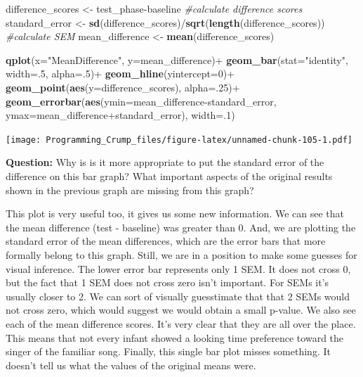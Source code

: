 \documentclass[]{book}
\newenvironment{Shaded}{\begin{snugshade}}{\end{snugshade}}
\newcommand{\KeywordTok}[1]{\textcolor[rgb]{0.13,0.29,0.53}{\textbf{{#1}}}}
\newcommand{\DataTypeTok}[1]{\textcolor[rgb]{0.13,0.29,0.53}{{#1}}}
\newcommand{\DecValTok}[1]{\textcolor[rgb]{0.00,0.00,0.81}{{#1}}}
\newcommand{\StringTok}[1]{\textcolor[rgb]{0.31,0.60,0.02}{{#1}}}
\newcommand{\CommentTok}[1]{\textcolor[rgb]{0.56,0.35,0.01}{\textit{{#1}}}}
\newcommand{\NormalTok}[1]{{#1}}
\theoremstyle{definition}
\theoremstyle{definition}
\theoremstyle{definition}
\theoremstyle{remark}
\begin{document}
\begin{Shaded}
\begin{Highlighting}[]
\NormalTok{difference_scores <-}\StringTok{ }\NormalTok{test_phase-baseline }\CommentTok{#calculate difference scores}
\NormalTok{standard_error <-}\StringTok{ }\KeywordTok{sd}\NormalTok{(difference_scores)/}\KeywordTok{sqrt}\NormalTok{(}\KeywordTok{length}\NormalTok{(difference_scores)) }\CommentTok{#calculate SEM}
\NormalTok{mean_difference <-}\StringTok{ }\KeywordTok{mean}\NormalTok{(difference_scores)}

\KeywordTok{qplot}\NormalTok{(}\DataTypeTok{x=}\StringTok{"MeanDifference"}\NormalTok{, }\DataTypeTok{y=}\NormalTok{mean_difference)+}
\StringTok{  }\KeywordTok{geom_bar}\NormalTok{(}\DataTypeTok{stat=}\StringTok{"identity"}\NormalTok{, }\DataTypeTok{width=}\NormalTok{.}\DecValTok{5}\NormalTok{, }\DataTypeTok{alpha=}\NormalTok{.}\DecValTok{5}\NormalTok{)+}
\StringTok{  }\KeywordTok{geom_hline}\NormalTok{(}\DataTypeTok{yintercept=}\DecValTok{0}\NormalTok{)+}
\StringTok{  }\KeywordTok{geom_point}\NormalTok{(}\KeywordTok{aes}\NormalTok{(}\DataTypeTok{y=}\NormalTok{difference_scores), }\DataTypeTok{alpha=}\NormalTok{.}\DecValTok{25}\NormalTok{)+}
\StringTok{  }\KeywordTok{geom_errorbar}\NormalTok{(}\KeywordTok{aes}\NormalTok{(}\DataTypeTok{ymin=}\NormalTok{mean_difference-standard_error, }
                                  \DataTypeTok{ymax=}\NormalTok{mean_difference+standard_error), }\DataTypeTok{width=}\NormalTok{.}\DecValTok{1}\NormalTok{)}
\end{Highlighting}
\end{Shaded}

\texttt{[image: Programming\_Crump\_files/figure-latex/unnamed-chunk-105-1.pdf]}

\textbf{Question:} Why is is it more appropriate to put the standard
error of the difference on this bar graph? What important aspects of the
original results shown in the previous graph are missing from this
graph?

This plot is very useful too, it gives us some new information. We can
see that the mean difference (test - baseline) was greater than 0. And,
we are plotting the standard error of the mean differences, which are
the error bars that more formally belong to this graph. Still, we are in
a position to make some guesses for visual inference. The lower error
bar represents only 1 SEM. It does not cross 0, but the fact that 1 SEM
does not cross zero isn't important. For SEMs it's usually closer to 2.
We can sort of visually guesstimate that that 2 SEMs would not cross
zero, which would suggest we would obtain a small p-value. We also see
each of the mean difference scores. It's very clear that they are all
over the place. This means that not every infant showed a looking time
preference toward the singer of the familiar song. Finally, this single
bar plot misses something. It doesn't tell us what the values of the
original means were.
\end{document}

